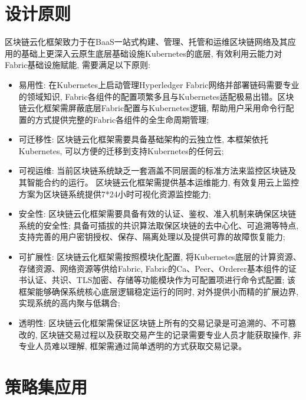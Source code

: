 \section{设计原则}\label{section: framework_characteristics}

区块链云化框架致力于在BaaS一站式构建、管理、托管和运维区块链网络及其应用的基础上更深入云原生底层基础设施Kubernetes的底层, 有效利用云能力对Fabric基础设施赋能, 需要满足以下原则:

\begin{itemize}[itemindent=2em]
    \item 易用性: 在Kubernetes上启动管理Hyperledger Fabric网络并部署链码需要专业的领域知识, Fabric各组件的配置项繁多且与Kubernetes适配极易出错。区块链云化框架需屏蔽底层Fabric配置与Kubernetes逻辑, 帮助用户采用命令行配置的方式提供完整的Fabric各组件的全生命周期管理;

    \item 可迁移性: 区块链云化框架需要具备基础架构的云独立性, 本框架依托Kubernetes, 可以方便的迁移到支持Kubernetes的任何云;

    \item 可视运维: 当前区块链系统缺乏一套涵盖不同层面的标准方法来监控区块链及其智能合约的运行\cite{zhangfuli2021smartcontract}。 区块链云化框架需提供基本运维能力, 有效复用云上监控方案为区块链系统提供7*24小时可视化资源监控能力;

    \item 安全性: 区块链云化框架需要具备有效的认证、鉴权、准入机制来确保区块链系统的安全性; 具备可插拔的共识算法取保区块链的去中心化、可追溯等特点, 支持完善的用户密钥授权、保存、隔离处理以及提供可靠的故障恢复能力;

    \item 可扩展性: 区块链云化框架需按照模块化配置, 将Kubernetes底层的计算资源、存储资源、网络资源等供给Fabric, Fabric的Ca、Peer、Orderer基本组件的证书认证、共识、TLS加密、存储等功能模块作为可配置项进行命令式配置; 该框架能够确保系统核心底层逻辑稳定运行的同时, 对外提供小而精的扩展边界, 实现系统的高内聚与低耦合;

    \item 透明性: 区块链云化框架需保证区块链上所有的交易记录是可追溯的、不可篡改的, 区块链交易过程以及获取交易产生的记录需要专业人员才能获取操作, 非专业人员难以理解, 框架需通过简单透明的方式获取交易记录。
\end{itemize}

\section{策略集应用}\label{section: policy_set_application}

